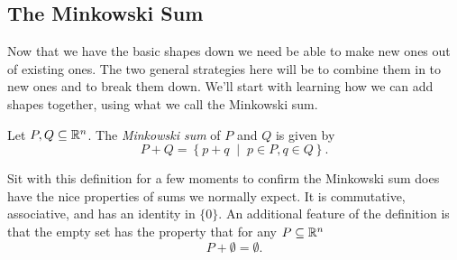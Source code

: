 \documentclass[12pt,oneside]{../../sfsuthesis}
\begin{document}
\subsection{The Minkowski Sum}
Now that we have the basic shapes down we need be able to make new ones out of existing ones.
The two general strategies here will be to combine them in to new ones and to break them down.
We'll start with learning how we can add shapes together, using what we call the Minkowski sum.
\begin{definition}\th\label{def:MinkowskiSum}
    Let \( P, Q \subseteq \mathbb{R}^n \).
    The \emph{Minkowski sum} of \( P \) and \( Q \) is given by
    \[
        P + Q = \left\{ p + q \; \middle| \; p \in P, q \in Q \right\}.
    \]
\end{definition}
Sit with this definition for a few moments to confirm the Minkowski sum does have the nice properties of sums we normally expect.
It is commutative, associative, and has an identity in \( \{ 0 \} \).
An additional feature of the definition is that the empty set has the property that for any \( P \subseteq \mathbb{R}^n \)
\[
    P + \emptyset = \emptyset.
\]
\end{document}
